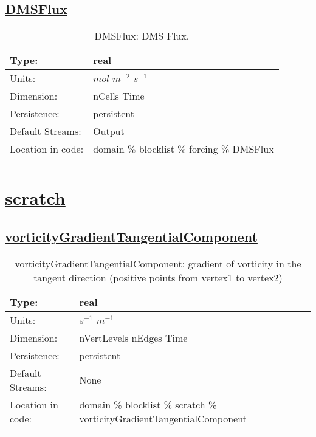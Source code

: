 \subsection[DMSFlux]{\hyperref[sec:var_tab_forcing]{DMSFlux}}
\label{subsec:var_sec_forcing_DMSFlux}
\begin{center}
\begin{longtable}{| p{2.0in} | p{4.0in} |}
        \hline 
        Type: & real \\
        \hline 
        Units: & $mol$ $m^{-2}$ $s^{-1}$ \\
        \hline 
        Dimension: & nCells Time \\
        \hline 
        Persistence: & persistent \\
        \hline 
		 Default Streams: & Output  \\
        \hline 
		 Location in code: & domain \% blocklist \% forcing \% DMSFlux \\
		 \hline 
    \caption{DMSFlux: DMS Flux.}
\end{longtable}
\end{center}
\section[scratch]{\hyperref[sec:var_tab_scratch]{scratch}}
\label{sec:var_sec_scratch}
\subsection[vorticityGradientTangentialComponent]{\hyperref[sec:var_tab_scratch]{vorticityGradientTangentialComponent}}
\label{subsec:var_sec_scratch_vorticityGradientTangentialComponent}
\begin{center}
\begin{longtable}{| p{2.0in} | p{4.0in} |}
        \hline 
        Type: & real \\
        \hline 
        Units: & $s^{-1}$ $m^{-1}$ \\
        \hline 
        Dimension: & nVertLevels nEdges Time \\
        \hline 
        Persistence: & persistent \\
        \hline 
		 Default Streams: & None \\
        \hline 
		 Location in code: & domain \% blocklist \% scratch \% vorticityGradientTangentialComponent \\
		 \hline 
    \caption{vorticityGradientTangentialComponent: gradient of vorticity in the tangent direction (positive points from vertex1 to vertex2)}
\end{longtable}
\end{center}
